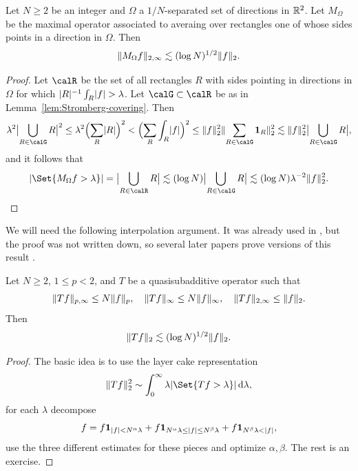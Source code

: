 \begin{theorem}[{\cite{MR0481883}}]
\label{thm:Stromberg-weak-2,2}
Let $N\geq 2$ be an integer and $\Omega$ a $1/N$-separated set of directions in $\mathbb{R}^{2}$.
Let $M_{\Omega}$ be the maximal operator associated to averaing over rectangles one of whose sides points in a direction in $\Omega$.
Then
\begin{equation}
\label{eq:Stromberg-weak-2,2}
\lVert M_{\Omega} f \rVert_{2,\infty} \lesssim (\log N)^{1/2} \lVert f \rVert_{2}.
\end{equation}
\end{theorem}
\begin{proof}
Let $\calR$ be the set of all rectangles $R$ with sides pointing in directions in $\Omega$ for which $\lvert R\rvert^{-1} \int_{R} \lvert f\rvert > \lambda$.
Let $\calG \subset \calR$ be as in Lemma~\ref{lem:Stromberg-covering}.
Then
\[
\lambda^{2} \abs[\big]{ \bigcup_{R \in \calG} R }^{2}
\leq
\lambda^{2} \Bigl( \sum_{R} \abs{R} \Bigr)^{2}
<
\Bigl( \sum_{R} \int_{R} \abs{f} \Bigr)^{2}
\leq
\norm{f}_{2}^{2} \norm{ \sum_{R\in\calG} \one_{R} }_{2}^{2}
\lesssim
\norm{f}_{2}^{2} \abs[\big]{ \bigcup_{R \in \calG} R },
\]
and it follows that
\[
\abs{ \Set{ M_{\Omega} f > \lambda } }
=
\abs[\big]{ \bigcup_{R \in \calR} R }
\lesssim
(\log N)
\abs[\big]{ \bigcup_{R \in \calG} R }
\lesssim
(\log N) \lambda^{-2} \norm{f}_{2}^{2}.
\qedhere
\]
\end{proof}

We will need the following interpolation argument.
It was already used in \cite{MR0481883}, but the proof was not written down, so several later papers prove versions of this result \cite{MR1261427,MR1681088,MR2680067}.
\begin{lemma}
\label{lem:3-point-weak-type-interpolation}
Let $N\geq 2$, $1\leq p < 2$, and $T$ be a quasisubadditive operator such that
\[
\lVert Tf\rVert_{p,\infty} \leq N \lVert f\rVert_{p},
\quad
\lVert Tf\rVert_{\infty} \leq N \lVert f\rVert_{\infty},
\quad
\lVert Tf\rVert_{2,\infty} \leq \lVert f\rVert_{2}.
\]
Then
\[
\lVert Tf\rVert_{2} \lesssim (\log N)^{1/2} \lVert f\rVert_{2}.
\]
\end{lemma}
\begin{proof}
The basic idea is to use the layer cake representation
\[
\norm{Tf}_{2}^{2} \sim \int_{0}^{\infty} \lambda \abs{ \Set{ Tf > \lambda } } \dif \lambda,
\]
for each $\lambda$ decompose
\[
f = f \mathbf{1}_{\lvert f\rvert < N^{\alpha}\lambda} + f \mathbf{1}_{ N^{\alpha}\lambda \leq \lvert f\rvert \leq N^{\beta}\lambda} + f \mathbf{1}_{N^{\beta}\lambda < \lvert f\rvert},
\]
use the three different estimates for these pieces and optimize $\alpha,\beta$.
The rest is an exercise.
\end{proof}

